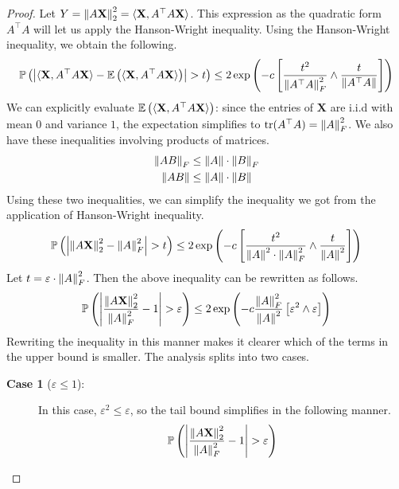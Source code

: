 \documentclass[11pt]{article}
\begin{document}
\begin{proof}
  Let $Y = \left\lVert A \mathbf{X}\right\rVert_2^2 = \langle \mathbf{X}, A^{\top}A \mathbf{X} \rangle$.
  This expression as the quadratic form $A^\top A$ will let us apply the Hanson-Wright inequality. Using the Hanson-Wright inequality, we obtain the following.
  \begin{align*}
    \mathbb{P}\left( \left| \langle \mathbf{X}, A^{\top}A \mathbf{X} \rangle
    - \mathbb{E}\left( \langle \mathbf{X}, A^{\top}A \mathbf{X} \rangle \right)
    \right| > t \right)
    \leq 2 \exp\left( -c \left[ \frac{t^2}{\left\lVert A^{\top}A\right\rVert_F^2} \wedge \frac{t}{\left\lVert A^{\top}A\right\rVert} \right] \right)
  \end{align*}
  We can explicitly evaluate $\mathbb{E} \left( \langle \mathbf{X}, A^{\top}A \mathbf{X} \rangle \right)$: since the entries of $\mathbf{X}$ are i.i.d with mean $0$ and variance $1$, the expectation simplifies to $\mathrm{tr}(A^{\top}A) = \left\lVert A\right\rVert_F^2$.
  We also have these inequalities involving products of matrices.
  \begin{align*}
    \left\lVert AB\right\rVert_F &\leq \left\lVert A\right\rVert \cdot \left\lVert B\right\rVert_F \\
    \left\lVert AB\right\rVert &\leq \left\lVert A\right\rVert \cdot \left\lVert B\right\rVert
  \end{align*}
  Using these two inequalities, we can simplify the inequality we got from the application of Hanson-Wright inequality.
  \begin{align*}
    \mathbb{P}\left( \left| \left\lVert A \mathbf{X}\right\rVert_2^2 - \left\lVert A\right\rVert_F^2 \right| > t \right)
    \leq 2 \exp\left( -c \left[ \frac{t^2}{\left\lVert A\right\rVert^2 \cdot \left\lVert A\right\rVert_F^2} \wedge \frac{t}{\left\lVert A\right\rVert^2} \right] \right)
  \end{align*}
  Let $t = \varepsilon \cdot \left\lVert A\right\rVert_F^2$. Then the above inequality can be rewritten as follows.
  \begin{align*}
    \mathbb{P}\left( \left| \frac{ \left\lVert A \mathbf{X}\right\rVert_2^2}{ \left\lVert A\right\rVert_F^2}  - 1 \right| > \varepsilon \right)
    \leq 2 \exp\left( -c \frac{\left\lVert A\right\rVert_F^2}{\left\lVert A\right\rVert^2} \left[ \varepsilon^2 \wedge \varepsilon \right] \right)
  \end{align*}
  Rewriting the inequality in this manner makes it clearer which of the terms in the upper bound is smaller.
  The analysis splits into two cases.
  \begin{description}
  \item[\textbf{Case 1} ($\varepsilon \leq 1$):] In this case, $\varepsilon^2 \leq \varepsilon$, so the tail bound simplifies in the following manner.
    \begin{align*}
    \P\left( \left| \frac{ \norm{A \mathbf{X}}_2^2}{ \norm{A}_F^2}  - 1 \right| > \varepsilon \right)

\end{align*}
\end{description}
\end{proof}
\end{document}
